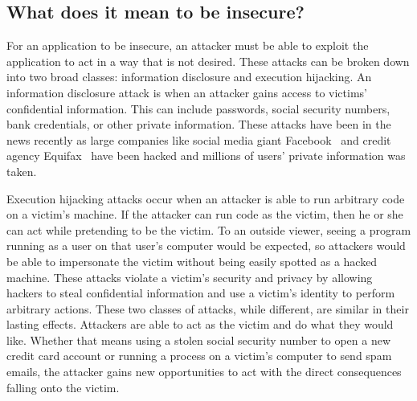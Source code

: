 \subsection{What does it mean to be insecure?}
\label{sec:whatIsInsecure}
For an application to be insecure, an attacker must be able to exploit the application to act in a way that is not desired.  These attacks can be broken down into two broad classes: information disclosure and execution hijacking.  An information disclosure attack is when an attacker gains access to victims' confidential information.  This can include passwords, social security numbers, bank credentials, or other private information.  These attacks have been in the news recently as large companies like social media giant Facebook~\cite{o'sullivan_2018} and credit agency Equifax~\cite{timberg_dwoskin_fung_2017} have been hacked and millions of users' private information was taken.  

Execution hijacking attacks occur when an attacker is able to run arbitrary code on a victim's machine.  If the attacker can run code as the victim, then he or she can act while pretending to be the victim.  To an outside viewer, seeing a program running as a user on that user's computer would be expected, so attackers would be able to impersonate the victim without being easily spotted as a hacked machine.  These attacks violate a victim's security and privacy by allowing hackers to steal confidential information and use a victim's identity to perform arbitrary actions.  These two classes of attacks, while different, are similar in their lasting effects.  Attackers are able to act as the victim and do what they would like.  Whether that means using a stolen social security number to open a new credit card account or running a process on a victim's computer to send spam emails, the attacker gains new opportunities to act with the direct consequences falling onto the victim.

